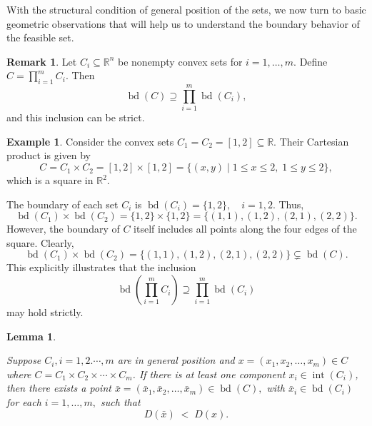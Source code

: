 \documentclass[12pt]{article}
\theoremstyle{plain}
\newtheorem{lemma}[theorem]{Lemma}
\theoremstyle{definition}
\newtheorem{remark}[theorem]{Remark}
\newtheorem{example}[theorem]{Example}
\newcommand{\bd}{\operatorname{bd}}
\newcommand{\interior}{\operatorname{int}}
\begin{document}
With the structural condition of general position of the sets, we now turn to basic geometric observations that will help us to understand the boundary behavior of the feasible set.

\begin{remark}
	Let \( C_i \subseteq \mathbb{R}^{n} \) be nonempty convex sets for \( i = 1, \dots, m \). Define \( C = \prod_{i=1}^{m} C_i \).
	Then
	\[
	\bd(C) \supseteq \prod_{i=1}^{m} \bd(C_i),
	\]
	and this inclusion can be strict.
\end{remark}

\begin{example}
	Consider the convex sets \(C_1 = C_2 = [1,2] \subseteq \mathbb{R}\). Their Cartesian product is given by
	\[
	C = C_1 \times C_2 = [1,2] \times [1,2] = \{(x,y) \mid 1 \leq x \leq 2, \; 1 \leq y \leq 2\},
	\]
	which is a square in \(\mathbb{R}^2\).
	
	The boundary of each set \(C_i\) is	$\bd(C_i) = \{1,2\}, \quad i=1,2.$
	Thus,
	\[
	\bd(C_1) \times \bd(C_2) = \{1,2\} \times \{1,2\} = \{(1,1), (1,2), (2,1), (2,2)\}.
	\]
	However, the boundary of \(C\) itself includes all points along the four edges of the square. Clearly,
	\[
	\bd(C_1) \times \bd(C_2) = \{(1,1), (1,2), (2,1), (2,2)\} \subsetneq \bd(C).
	\]
	This explicitly illustrates that the inclusion
	\[
	\bd\left(\prod_{i=1}^{m} C_i\right) \supseteq \prod_{i=1}^{m} \bd(C_i)
	\]
	may hold strictly.
\end{example}



\begin{lemma}\label{interior_Distance_lemma}
	
	Suppose $C_i, i=1,2.\cdots, m$ are in general position and  $x = (x_1\allowbreak, x_2\allowbreak, \dots\allowbreak, x_m) \in C$ where  $C=C_1 \times C_2 \times \cdots \times C_m$. If there is at least one component \(x_i\in \interior(C_i)\), then there exists a point 
	$\bar{x} = (\bar{x}_1,\bar{x}_2,\dots,\bar{x}_m)\in \bd(C),$ with
	$\bar{x}_i\in \bd(C_i)$ for each $i=1,\dots,m,$	such that
	\[
	D(\bar{x}) \;<\; D(x).
	\]
\end{lemma}
\end{document}
